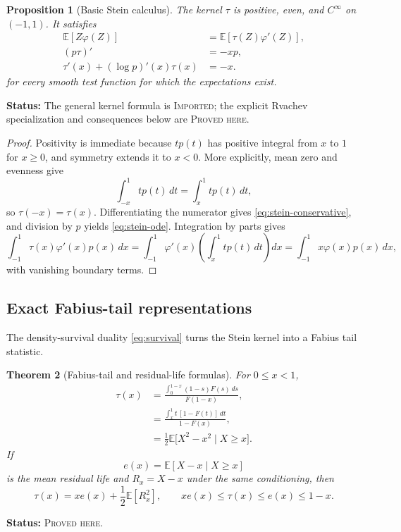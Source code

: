 \documentclass[11pt,oneside]{article}
\newtheorem{theorem}{Theorem}[section]
\newtheorem{proposition}[theorem]{Proposition}
\theoremstyle{definition}
\theoremstyle{remark}
\newcommand{\E}{\mathbb E}
\newcommand{\Imported}{\textcolor{linkblue}{\textsc{Imported}}}
\newcommand{\ProvedHere}{\textcolor{statusgreen}{\textsc{Proved here}}}
\newcommand{\Status}[1]{\par\smallskip\noindent\textbf{Status:} #1.\par\smallskip}
\begin{document}
\begin{proposition}[Basic Stein calculus]\label{prop:stein-basic}
The kernel $\tau$ is positive, even, and $C^\infty$ on $(-1,1)$.  It satisfies
\begin{align}
 \E[Z\varphi(Z)]&=\E[\tau(Z)\varphi'(Z)],\label{eq:stein-identity}\\
 (p\tau)'&=-xp,\label{eq:stein-conservative}\\
 \tau'(x)+(\log p)'(x)\tau(x)&=-x.\label{eq:stein-ode}
\end{align}
for every smooth test function for which the expectations exist.
\end{proposition}
\Status{The general kernel formula is \Imported; the explicit Rvachev
specialization and consequences below are \ProvedHere}

\begin{proof}
Positivity is immediate because $t p(t)$ has positive integral from $x$ to $1$
for $x\ge0$, and symmetry extends it to $x<0$.  More explicitly, mean zero and
evenness give
\[
 \int_{-x}^1t p(t)\,dt=\int_x^1t p(t)\,dt,
\]
so $\tau(-x)=\tau(x)$.  Differentiating the numerator gives
\eqref{eq:stein-conservative}, and division by $p$ yields \eqref{eq:stein-ode}.
Integration by parts gives
\[
 \int_{-1}^1\tau(x)\varphi'(x)p(x)\,dx
 =\int_{-1}^1\varphi'(x)\left(\int_x^1t p(t)\,dt\right)dx
 =\int_{-1}^1x\varphi(x)p(x)\,dx,
\]
with vanishing boundary terms.
\end{proof}

\subsection{Exact Fabius-tail representations}
The density-survival duality \eqref{eq:survival} turns the Stein kernel into a
Fabius tail statistic.

\begin{theorem}[Fabius-tail and residual-life formulas]\label{thm:stein-tail}
For $0\le x<1$,
\begin{align}
 \tau(x)
 &=\frac{\displaystyle\int_0^{1-x}(1-s)F(s)\,ds}{F(1-x)},
 \label{eq:stein-F}\tag{T1}\\
 &=\frac{\displaystyle\int_x^1t\,[1-F(t)]\,dt}{1-F(x)},
 \label{eq:stein-survival}\tag{T2}\\
 &=\frac12\E\bigl[X^2-x^2\mid X\ge x\bigr].
 \label{eq:stein-conditional}\tag{T3}
\end{align}
If
\[
 e(x)=\E[X-x\mid X\ge x]
\]
is the mean residual life and $R_x=X-x$ under the same conditioning, then
\begin{equation}\label{eq:stein-residual}
 \tau(x)=x e(x)+\frac12\E[R_x^2],
 \qquad x e(x)\le\tau(x)\le e(x)\le1-x.
\end{equation}
\end{theorem}
\Status{\ProvedHere}
\end{document}
